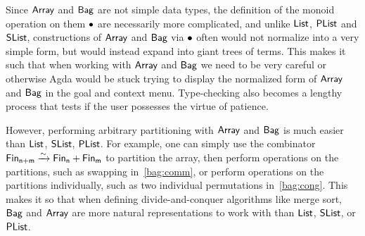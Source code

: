 \begin{toappendix}
    Since $\operatorname{\mathsf{Array}}$ and $\operatorname{\mathsf{Bag}}$ are not simple data types, the definition of
    the monoid operation on them $\mathbin{\bullet}$ are necessarily more complicated, and unlike $\operatorname{\mathsf{List}}$, $\operatorname{\mathsf{PList}}$
    and $\operatorname{\mathsf{SList}}$, constructions of $\operatorname{\mathsf{Array}}$ and $\operatorname{\mathsf{Bag}}$ via $\mathbin{\bullet}$ often would not normalize into a
    very simple form, but would instead expand into giant trees of terms. This makes it such that when working
    with $\operatorname{\mathsf{Array}}$ and $\operatorname{\mathsf{Bag}}$ we need to be very careful or otherwise Agda would be stuck trying to display
    the normalized form of $\operatorname{\mathsf{Array}}$ and $\operatorname{\mathsf{Bag}}$ in the goal and context menu. Type-checking also becomes a lengthy
    process that tests if the user possesses the virtue of patience.

    However, performing arbitrary partitioning with $\operatorname{\mathsf{Array}}$ and $\operatorname{\mathsf{Bag}}$ is much easier than
    $\operatorname{\mathsf{List}}$, $\operatorname{\mathsf{SList}}$, $\operatorname{\mathsf{PList}}$. For example,
    one can simply use the combinator ${\Fin[n+m] \xto{\sim} \Fin[n] + \Fin[m]}$ to partition the array,
    then perform operations on the partitions, such as swapping in~\cref{bag:comm},
    or perform operations on the partitions individually, such as two individual permutations in~\cref{bag:cong}.
    This makes it so that when defining divide-and-conquer algorithms like merge sort,
    $\operatorname{\mathsf{Bag}}$ and $\operatorname{\mathsf{Array}}$ are more natural representations to work with than $\operatorname{\mathsf{List}}$, $\operatorname{\mathsf{SList}}$, or $\operatorname{\mathsf{PList}}$.
\end{toappendix}
